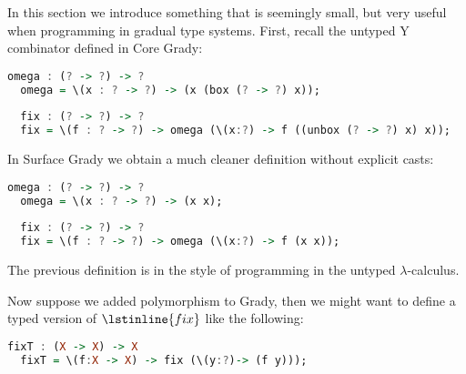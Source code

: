 In this section we introduce something that is seemingly small, but
very useful when programming in gradual type systems.  First, recall
the untyped Y combinator defined in Core Grady:
\begin{lstlisting}[language=Haskell]
  omega : (? -> ?) -> ?
  omega = \(x : ? -> ?) -> (x (box (? -> ?) x));
  
  fix : (? -> ?) -> ?
  fix = \(f : ? -> ?) -> omega (\(x:?) -> f ((unbox (? -> ?) x) x));
\end{lstlisting}
In Surface Grady we obtain a much cleaner definition without explicit
casts:
\begin{lstlisting}[language=Haskell]
  omega : (? -> ?) -> ?
  omega = \(x : ? -> ?) -> (x x);
  
  fix : (? -> ?) -> ?
  fix = \(f : ? -> ?) -> omega (\(x:?) -> f (x x));
\end{lstlisting}
The previous definition is in the style of programming in the untyped
$\lambda$-calculus.

Now suppose we added polymorphism to Grady, then we might want to
define a typed version of $\lstinline{fix}$ like the following:
\begin{lstlisting}[language=Haskell]
  fixT : (X -> X) -> X
  fixT = \(f:X -> X) -> fix (\(y:?)-> (f y)));
\end{lstlisting}

